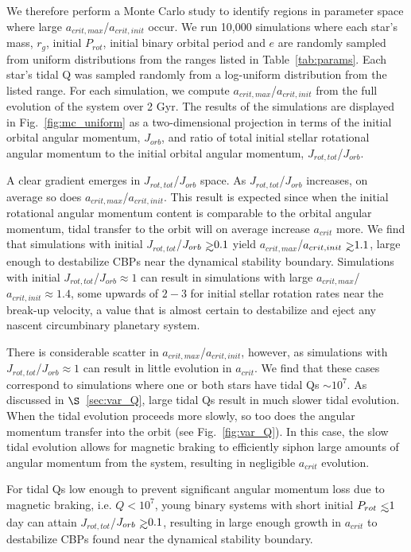 We therefore perform a Monte Carlo study to identify regions in parameter space where large $a_{crit,max}$/$a_{crit,init}$ occur.  We run 10,000 simulations where each star's mass, $r_g$, initial $P_{rot}$, initial binary orbital period and $e$ are randomly sampled from uniform distributions from the ranges listed in Table~\ref{tab:params}.  Each star's tidal Q was sampled randomly from a log-uniform distribution from the listed range.  For each simulation, we compute $a_{crit,max}$/$a_{crit,init}$ from the full evolution of the system over 2 Gyr.  The results of the simulations are displayed in Fig.~\ref{fig:mc_uniform} as a two-dimensional projection in terms of the initial orbital angular momentum, $J_{orb}$, and ratio of total initial stellar rotational angular momentum to the initial orbital angular momentum, $J_{rot,tot}$/$J_{orb}$.

A clear gradient emerges in $J_{rot,tot}$/$J_{orb}$ space.  As $J_{rot,tot}$/$J_{orb}$ increases, on average so does $a_{crit,max}$/$a_{crit,init}$.  This result is expected since when the initial rotational angular momentum content is comparable to the orbital angular momentum, tidal transfer to the orbit will on average increase $a_{crit}$ more.  We find that simulations with initial $J_{rot,tot}$/$J_{orb} \gsim 0.1$ yield $a_{crit,max}$/$a_{crit,init} \gsim 1.1$, large enough to destabilize CBPs near the dynamical stability boundary.  Simulations with initial $J_{rot,tot}$/$J_{orb} \approx 1$ can result in simulations with large $a_{crit,max}$/$a_{crit,init} \approx 1.4$, some upwards of $2-3$ for initial stellar rotation rates near the break-up velocity, a value that is almost certain to destabilize and eject any nascent circumbinary planetary system.

There is considerable scatter in $a_{crit,max}$/$a_{crit,init}$, however, as simulations with $J_{rot,tot}$/$J_{orb} \approx 1$ can result in little evolution in $a_{crit}$.  We find that these cases correspond to simulations where one or both stars have tidal Qs ${\sim}10^7$.  As discussed in $\S$~\ref{sec:var_Q}, large tidal Qs result in much slower tidal evolution.  When the tidal evolution proceeds more slowly, so too does the angular momentum transfer into the orbit (see Fig.~\ref{fig:var_Q}).  In this case, the slow tidal evolution allows for magnetic braking to efficiently siphon large amounts of angular momentum from the system, resulting in negligible $a_{crit}$ evolution.

For tidal Qs low enough to prevent significant angular momentum loss due to magnetic braking, i.e. $Q < 10^7$, young binary systems with short initial $P_{rot} \lsim 1$ day can attain $J_{rot,tot}$/$J_{orb} \gsim 0.1$, resulting in large enough growth in $a_{crit}$ to destabilize CBPs found near the dynamical stability boundary.  

